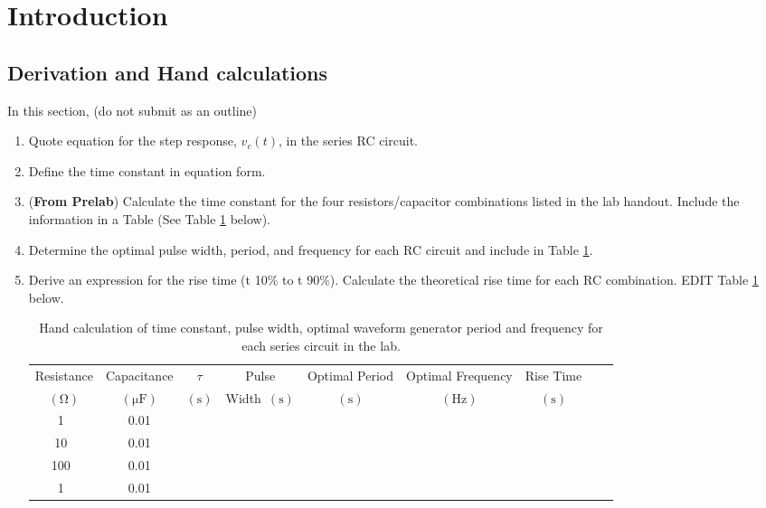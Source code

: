 \documentclass[11pt]{article}
\begin{document}
\section {Introduction}

\subsection{Derivation and Hand calculations}
\label{Section:DerivationHandCalc}
In this section, (do not submit as an outline)
\begin{enumerate}
	\item Quote equation for the step response, $v_c(t)$, in  the series RC circuit. 
	\item Define the time constant in equation form.
	\item (\textbf{From Prelab}) Calculate the time constant for the four resistors/capacitor combinations listed in the lab handout.  Include the information in a Table (See Table \ref{Table:TimeConstantTable} below).
	\item Determine the optimal pulse width, period, and frequency for each RC circuit and include in Table \ref{Table:TimeConstantTable}.
	\item Derive an expression for the rise time (t 10\% to t  90\%).  Calculate the theoretical rise time for  each RC combination. EDIT Table \ref{Table:TimeConstantTable} below.
	\begin{table}[h]
	\centering
	\caption{Hand calculation of time constant, pulse width, optimal waveform generator period and frequency for each series circuit in the lab.}
	\label{Table:TimeConstantTable}
	\begin{tabular}{|c |c|| c|| c | c | c| c|c|c |}\hline
		Resistance  & Capacitance &  $\tau$ & Pulse & Optimal Period  & Optimal Frequency & Rise Time   \\
		$\left(\si{\ohm}\right)$ 	  & $\left(\si{\micro\farad}\right)$	 & $\left(\si{\s}\right)$     & Width~$\left(\si{\s}\right)$         & $\left(\si{\s}\right)$ 		    &  $\left(\si{\hertz}\right)$ & $\left(\si{\s}\right)$  \\
		\hline
		1~\si{\kilo}& 0.01& & & && \\
		\hline
		10~\si{\kilo}& 0.01& & & && \\
		\hline
		100~\si{\kilo}& 0.01& & & & &\\
		\hline
		1~\si{\mega}& 0.01& & & && \\
		\hline
	\end{tabular}
\end{table}
	
\end{enumerate}
\end{document}
